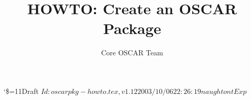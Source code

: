 \documentclass[letterpaper]{article}
\title{HOWTO: Create an OSCAR Package}
\author{Core OSCAR Team}
\begin{document}
\maketitle

\begin{center}
  {\catcode`\$=11\tiny\noindent Draft $Id: oscarpkg-howto.tex,v 1.12 2003/10/06 22:26:19 naughtont Exp $}
\end{center}

\tableofcontents
\listoftables

\newpage



















%
%


%
%
\newpage   %
\appendix








%
\end{document}
